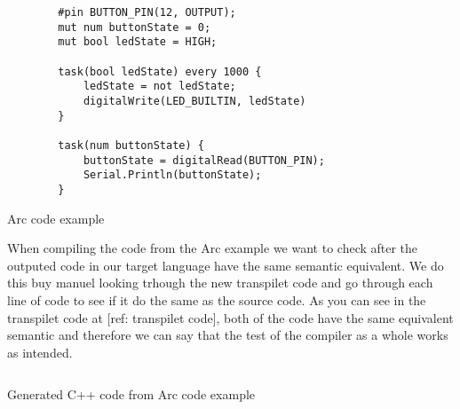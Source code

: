 

\begin{listing}[htb!]
    \begin{verbatim}
        #pin BUTTON_PIN(12, OUTPUT);
        mut num buttonState = 0;
        mut bool ledState = HIGH;

        task(bool ledState) every 1000 {
            ledState = not ledState;
            digitalWrite(LED_BUILTIN, ledState)
        }

        task(num buttonState) {
            buttonState = digitalRead(BUTTON_PIN);
            Serial.Println(buttonState);
        }
    \end{verbatim}
    \caption{Arc code example}
    \label{lst:arc code example}
\end{listing}

When compiling the code from the Arc example we want to check after the outputed code in our target language have the same semantic equivalent. We do this buy manuel looking trhough the new transpilet code and go through each line of code to see if it do the same as the source code. As you can see in the transpilet code at [ref: transpilet code], both of the code have the same equivalent semantic and therefore we can say that the test of the compiler as a whole works as intended.

\begin{listing}[htb!]
    \begin{verbatim}

    \end{verbatim}
    \caption{Generated C++ code from Arc code example}
    \label{lst:generated C++ code from Arc code example}
\end{listing}